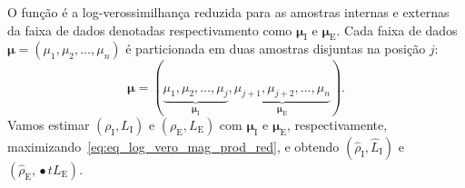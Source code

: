 O função é a log-verossimilhança reduzida para as amostras internas e externas da faixa de dados denotadas respectivamento como $\bm \mu_\text{I}$ e $\bm \mu_\text{E}$. Cada faixa de dados $\bm \mu = (\mu_1,\mu_2,\dots,\mu_n)$ é particionada em duas amostras disjuntas na posição $j$:  
$$
\bm \mu = (\underbrace{\mu_1,\mu_2,\dots,\mu_j}_{\bm \mu_\text{I}}, 
\underbrace{\mu_{j+1}, \mu_{j+2},\dots,\mu_n}_{\bm \mu_\text{E}}).
$$
Vamos estimar $(\rho_\text{I},L_\text{I})$ e $(\rho_\text{E},L_\text{E})$ com $\bm \mu_\text{I}$ e $\bm \mu_\text{E}$, respectivamente, maximizando~\eqref{eq:eq_log_vero_mag_prod_red}, e obtendo $(\widehat{\rho}_\text{I}, \widehat{L}_\text{I})$ e $(\widehat{\rho}_\text{E}, \widehat{•}t{L}_\text{E})$.

